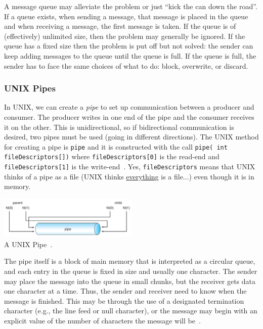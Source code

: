 A message queue may alleviate the problem or just ``kick the can down the road''. If a queue exists, when sending a message, that message is placed in the queue and when receiving a message, the first message is taken. If the queue is of (effectively) unlimited size, then the problem may generally be ignored. If the queue has a fixed size then the problem is put off but not solved: the sender can keep adding messages to the queue until the queue is full. If the queue is full, the sender has to face the same choices of what to do: block, overwrite, or discard.

\subsubsection*{UNIX Pipes}

In UNIX, we can create a \textit{pipe} to set up communication between a producer and consumer. The producer writes in one end of the pipe and the consumer receives it on the other. This is unidirectional, so if bidirectional communication is desired, two pipes must be used (going in different directions). The UNIX method for creating a pipe is \texttt{pipe} and it is constructed with the call \texttt{pipe( int fileDescriptors[])} where \texttt{fileDescriptors[0]} is the read-end and \texttt{fileDescriptors[1]} is the write-end~\cite{osc}. Yes, \texttt{fileDescriptors} means that UNIX thinks of a pipe as a file (UNIX thinks \underline{everything} is a file...) even though it is in memory.

\begin{center}
	\includegraphics[width=0.5\textwidth]{images/unix-pipe.png}\\
	A UNIX Pipe~\cite{osc}.
\end{center}

The pipe itself is a block of main memory that is interpreted as a circular queue, and each entry in the queue is fixed in size and usually one character. The sender may place the message into the queue in small chunks, but the receiver gets data one character at a time. Thus, the sender and receiver need to know when the message is finished. This may be through the use of a designated termination character (e.g., the line feed or null character), or the message may begin with an explicit value of the number of characters the message will be~\cite{mte241}.

